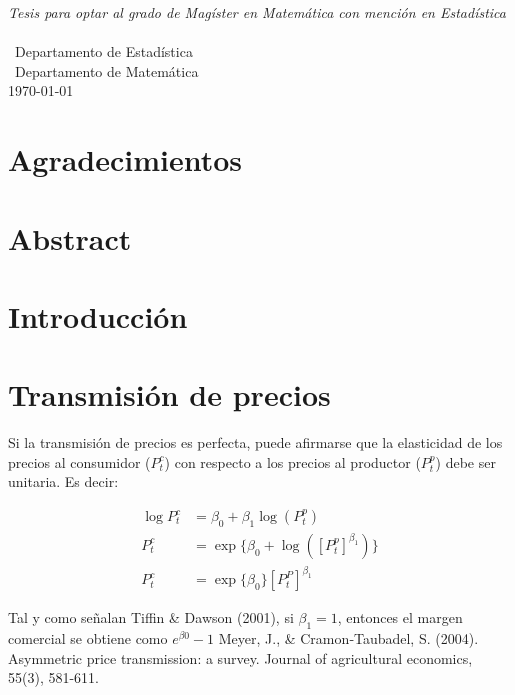 \documentclass[12pt, twoside]{book}\usepackage[]{graphicx}\usepackage[]{color}
\numberwithin{equation}{section}
\numberwithin{theorem}{section}
\numberwithin{teorema}{section}
\numberwithin{defi}{section}
\numberwithin{prop}{section}
\numberwithin{defi}{section}
\theoremstyle{plain}
\begin{document}
\begin{titlepage}
\begin{center}
\large \textit{Tesis para optar al grado de Magíster en Matemática con mención en Estadística}\\[0.3cm] %
\textit{}\\[0.4cm]
\ Departamento de Estadística \\
[0.4cm]\ Departamento de Matemática
\\[1cm] %
 
{\large \today}\\[2cm] %
 
\end{center}

\end{titlepage}
\newpage



\tableofcontents

\listoffigures
\listoftables
\onehalfspacing
\chapter*{Agradecimientos}
\chapter*{Abstract}
\chapter{Introducción}


\chapter{Transmisión de precios}

Si la transmisión de precios es perfecta, puede afirmarse que la elasticidad de los precios al consumidor ($P_{t}^{c}$) con respecto a los precios al productor ($P_{t}^{p}$) debe ser unitaria. Es decir: 

\begin{align}
\log P_{t}^{c} & = \beta_{0}+\beta_1 \log(P_{t}^{p}) \\ 
P_{t}^{c} & = \exp\{\beta_{0}+ \log([P_{t}^{p}]^{\beta_{1}})\} \\
P_{t}^{c} & = \exp\{\beta_{0}\}[P_{t}^{P}]^{\beta_1} \label{margen}
\end{align}

Tal y como señalan Tiffin \& Dawson (2001), si $\beta_{1}=1$, entonces el margen comercial se obtiene como $e^{\beta0}-1$
Meyer, J., \& Cramon‐Taubadel, S. (2004). Asymmetric price transmission: a survey. Journal of agricultural economics, 55(3), 581-611.
\end{document}

